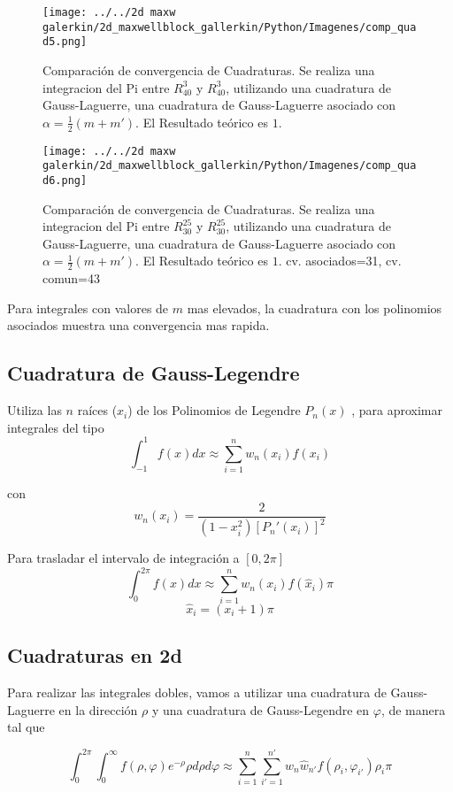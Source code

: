 		
		\begin{figure}[h]
			\texttt{[image: ../../2d maxw galerkin/2d\_maxwellblock\_gallerkin/Python/Imagenes/comp\_quad5.png]}
			\caption{Comparación de convergencia de  Cuadraturas. Se realiza una integracion del Pi entre $R_{40}^3$ y $R_{40}^3$, utilizando una cuadratura de Gauss-Laguerre, una cuadratura de Gauss-Laguerre asociado con $\alpha =\tfrac{1}{2}(m+m')$. El Resultado teórico es $1$. }
		\end{figure}
	
		\begin{figure}[h]
			\texttt{[image: ../../2d maxw galerkin/2d\_maxwellblock\_gallerkin/Python/Imagenes/comp\_quad6.png]}
			\caption{Comparación de convergencia de  Cuadraturas. Se realiza una integracion del Pi entre $R_{30}^{25}$ y $R_{30}^{25}$, utilizando una cuadratura de Gauss-Laguerre, una cuadratura de Gauss-Laguerre asociado con $\alpha =\tfrac{1}{2}(m+m')$. El Resultado teórico es $1$.
			cv. asociados=31, cv. comun=43 }
		\end{figure}
		
		Para integrales con valores de $m$ mas elevados, la cuadratura con los polinomios asociados muestra una convergencia mas rapida. 
		
	\subsection{Cuadratura de Gauss-Legendre}
		
		Utiliza las $n$ raíces ($x_i$) de los Polinomios de Legendre $P_n(x)$ , para aproximar integrales del tipo
		\[ \int_{-1}^{1}f(x)dx\approx \sum_{i=1}^n w_n(x_i) f(x_i)    \]
		
		con 
		\[w_n(x_i)=\frac{2}{(1-x_i^2)[P_n'(x_i)]^2}\]
		
		Para trasladar el intervalo de integración a $[0,2\pi]$
		\[ \int_{0}^{2\pi}f(x)dx\approx \sum_{i=1}^n w_n(x_i) f(\hat{x}_i) \pi    \]
		\[ \hat{x}_i=(x_i+1)\pi \] 
		
	\subsection{Cuadraturas en 2d}
		
		Para realizar las integrales dobles, vamos a utilizar una cuadratura de Gauss-Laguerre en la dirección $\rho$ y una cuadratura de Gauss-Legendre en $\varphi$, de manera tal que 
		
		\[\int_{0}^{2\pi}\int_{0}^{\infty}f(\rho,\varphi)e^{-\rho}\rho d\rho d\varphi \approx \sum_{i=1}^n \sum_{i'=1}^{n'} w_n \hat{w}_{n'} f(\rho_i,\varphi_{i'})\rho_i \pi 
		\]
		
